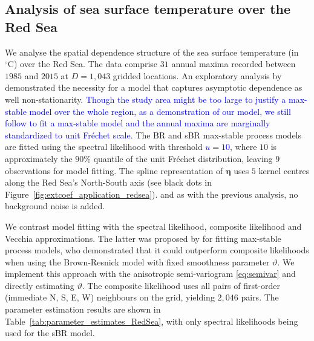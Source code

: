 \documentclass[12pt]{article}
\newcommand{\PZ}{\textcolor{blue}}
\begin{document}
\subsection{Analysis of sea surface temperature over the Red Sea}

We analyse the spatial dependence structure of the sea surface temperature (in $^\circ \textrm{C}$) over the Red Sea. The data comprise $31$ annual maxima recorded between $1985$ and $2015$ at $D=1,043$ gridded locations. An exploratory analysis by \citet{Hazra.Huser:2021} demonstrated the necessity for a model that captures asymptotic dependence as well non-stationarity. \PZ{Though the study area might be too large to justify a max-stable model over the whole region, as a demonstration of our model, we still follow \cite{Huser.Zhong:2023} to fit a max-stable model and the annual maxima are marginally standardized to unit Fr\'{e}chet scale.} The BR and sBR max-stable process models are fitted using the spectral likelihood with threshold \PZ{$u=10$}, where $10$ is approximately the $90\%$ quantile of the unit Fr\'echet distribution, leaving $9$ observations for model fitting. The spline representation of $\bm\eta$ 
uses $5$ kernel centres 
along the Red Sea's North-South axis 
(see black dots in Figure~\ref{fig:extcoef_application_redsea}). 
and as with
the previous analysis, no background noise is added. 
%

We contrast model fitting with the spectral likelihood, composite likelihood and Vecchia approximations.
%
The latter was proposed by \cite{Huser.Zhong:2023} for fitting max-stable process models, who demonstrated that it could outperform composite likelihoods when using the Brown-Resnick model with fixed smoothness parameter $\vartheta$. We implement this approach with the anisotropic semi-variogram \eqref{eq:semivar} and directly estimating $\vartheta$.
%
The composite likelihood uses all pairs of first-order (immediate N, S, E, W) neighbours on the grid, yielding $2,046$ pairs. 
%
The parameter estimation results are shown in Table~\ref{tab:parameter_estimates_RedSea}, with only spectral likelihoods being used for the sBR model.
\end{document}
